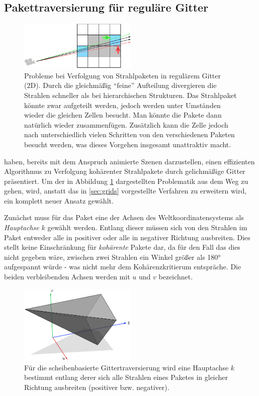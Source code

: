 \subsection{Pakettraversierung für reguläre Gitter}
\begin{figure}\centering
\includegraphics[width=0.5\textwidth]{images/gridpacket.pdf} 
\caption[Probleme bei Verfolgung von Strahlpaketen in regulärem Gitter (2D)]{Probleme bei Verfolgung von Strahlpaketen in regulärem Gitter (2D). Durch die gleichmäßig ``feine'' Aufteilung divergieren die Strahlen schneller als bei hierarchischen Strukturen. Das Strahlpaket könnte zwar aufgeteilt werden, jedoch werden unter Umständen wieder die gleichen Zellen besucht. Man könnte die Pakete dann natürlich wieder zusammenfügen. Zusätzlich kann die Zelle jedoch nach unterschiedlich vielen Schritten von den verschiedenen Paketen besucht werden, was dieses Vorgehen insgesamt unattraktiv macht.}
\label{fig:divergeandcommon}
\end{figure}


\cite{WIKKP06} haben, bereits mit dem Anspruch animierte Szenen darzustellen, einen effizienten Algorithmus zu Verfolgung kohärenter Strahlpakete durch gelichmäßige Gitter präsentiert. Um der in Abbildung \ref{fig:divergeandcommon} dargestellten Problematik aus dem Weg zu gehen, wird, anstatt das in \ref{sec:grids} vorgestellte Verfahren zu erweitern wird, ein komplett neuer Ansatz gewählt.

Zunächst muss für das Paket eine der Achsen des Weltkoordinatensystems als \textit{Hauptachse} $k$ gewählt werden. Entlang dieser müssen sich von den Strahlen im Paket entweder alle in positiver oder alle in negativer Richtung ausbreiten. Dies stellt keine Einschränkung für \textit{kohärente} Pakete dar, da für den Fall das dies nicht gegeben wäre, zwischen zwei Strahlen ein Winkel größer als 180° aufgespannt würde - was nicht mehr dem Kohärenzkritierum entspräche. Die beiden verbleibenden Achsen werden mit $u$ und $v$ bezeichnet.

\begin{figure}\centering
\includegraphics[width=0.5\textwidth]{images/gridmainaxis.pdf} 
\caption[Gemeinsame Hauptachse für scheibenbasierte Gittertraversierung]{Für die scheibenbasierte Gittertraversierung wird eine Hauptachse $k$ bestimmt entlang derer sich alle Strahlen eines Paketes in gleicher Richtung ausbreiten (positiver bzw. negativer). }
\label{fig:gridmainaxis}
\end{figure}

